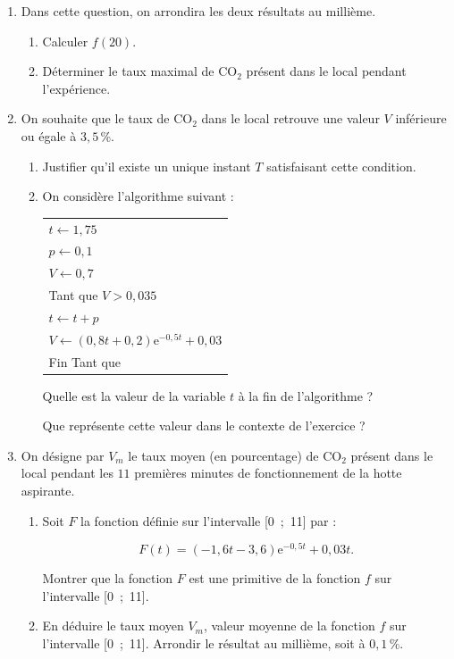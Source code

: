 \documentclass[10pt,a4paper]{article}
\begin{document}
\begin{enumerate}
\item Dans cette question, on arrondira les deux résultats au millième.
	\begin{enumerate}
		\item Calculer $f (20)$.
		\item Déterminer le taux maximal de CO$_2$ présent dans le local pendant l'expérience.
 	\end{enumerate}
\item  On souhaite que le taux de CO$_2$ dans le local retrouve une valeur $V$ inférieure ou égale à $3,5$\,\%.
	\begin{enumerate}
		\item Justifier qu'il existe un unique instant $T$ satisfaisant cette condition.
		\item On considère l'algorithme suivant :
		
\begin{center}
\begin{tabularx}{0.5\linewidth}{|X|}\hline
$t \gets 1,75$\\
$p \gets 0,1$\\
$V \gets 0,7$\\
Tant que $V > 0,035$\\
\hspace{0.75cm}$t \gets t + p$\\
\hspace{0.75cm}$V \gets (0,8t + 0,2)\text{e}^{-0,5t} + 0,03$\\
Fin Tant que\\ \hline
\end{tabularx}
\end{center}		
		
Quelle est la valeur de la variable $t$ à la fin de l'algorithme ?
		
Que représente cette valeur dans le contexte de l'exercice ?
 	\end{enumerate}
\item  On désigne par $V_m$ le taux moyen (en pourcentage) de CO$_2$ présent dans le local pendant les $11$
premières minutes de fonctionnement de la hotte aspirante.
	\begin{enumerate}
		\item Soit $F$ la fonction définie sur l'intervalle [0~;~11] par : 
		
		\[F(t) = (-1,6t -3,6)\text{e}^{-0,5t} +0,03t.\]
		
Montrer que la fonction $F$ est une primitive de la fonction $f$ sur l'intervalle [0~;~11].
		\item En déduire le taux moyen $V_m$, valeur moyenne de la fonction $f$ sur l'intervalle [0~;~11].
Arrondir le résultat au millième, soit à $0,1$\,\%.
	\end{enumerate}
\end{enumerate}
\end{document}
